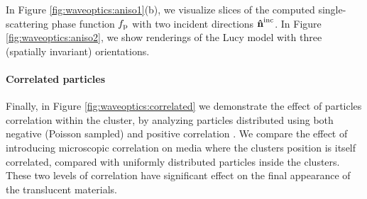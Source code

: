 In Figure \ref{fig:waveoptics:aniso1}(b), we visualize slices of the computed single-scattering phase function $f_\mathrm{p}$ with two incident directions $\mathbf{\hat{n}}^{\text{inc}}$.
In Figure \ref{fig:waveoptics:aniso2}, we show renderings of the Lucy model with three (spatially invariant) orientations.




\paragraph{Correlated particles}

Finally, in Figure \ref{fig:waveoptics:correlated} we demonstrate the effect of particles correlation within the cluster, by analyzing particles distributed using both negative (Poisson sampled) and positive correlation \cite{jarabo2018radiative}. We compare the effect of introducing microscopic correlation on media where the clusters position is itself correlated, compared with uniformly distributed particles inside the clusters. These two levels of correlation have significant effect on the final appearance of the translucent materials. 


